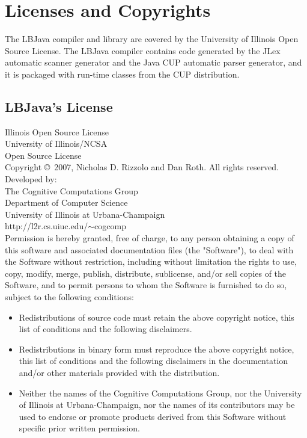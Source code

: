 
\chapter{Licenses and Copyrights}

The LBJava compiler and library are covered by the University of Illinois Open
Source License.  The LBJava compiler contains code generated by the JLex
automatic scanner generator and the Java CUP automatic parser generator, and
it is packaged with run-time classes from the CUP distribution.

\section{LBJava's License}

\noindent
Illinois Open Source License \\
University of Illinois/NCSA \\
Open Source License \\

\noindent
Copyright \copyright~2007, Nicholas D. Rizzolo and Dan Roth.  All rights
reserved. \\

\noindent
Developed by: \\
   The Cognitive Computations Group \\
   Department of Computer Science \\
   University of Illinois at Urbana-Champaign \\
   http://l2r.cs.uiuc.edu/$\sim$cogcomp \\

\noindent
Permission is hereby granted, free of charge, to any person obtaining a copy
of this software and associated documentation files (the "Software"), to deal
with the Software without restriction, including without limitation the rights
to use, copy, modify, merge, publish, distribute, sublicense, and/or sell
copies of the Software, and to permit persons to whom the Software is
furnished to do so, subject to the following conditions:

\begin{itemize}
\item Redistributions of source code must retain the above copyright notice,
      this list of conditions and the following disclaimers.
\item Redistributions in binary form must reproduce the above copyright
      notice, this list of conditions and the following disclaimers in the
      documentation and/or other materials provided with the distribution.
\item Neither the names of the Cognitive Computations Group, nor the
      University of Illinois at Urbana-Champaign, nor the names of its
      contributors may be used to endorse or promote products derived from
      this Software without specific prior written permission.
\end{itemize}

